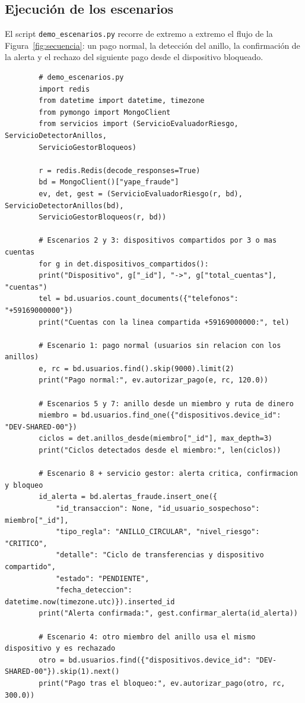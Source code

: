 \documentclass[11pt,a4paper]{article}
\begin{document}
	\subsection{Ejecución de los escenarios}
	El script \texttt{demo\_escenarios.py} recorre de extremo a extremo el flujo de la Figura~\ref{fig:secuencia}: un pago normal, la detección del anillo, la confirmación de la alerta y el rechazo del siguiente pago desde el dispositivo bloqueado.
	\begin{lstlisting}
		# demo_escenarios.py
		import redis
		from datetime import datetime, timezone
		from pymongo import MongoClient
		from servicios import (ServicioEvaluadorRiesgo, ServicioDetectorAnillos,
		ServicioGestorBloqueos)
		
		r = redis.Redis(decode_responses=True)
		bd = MongoClient()["yape_fraude"]
		ev, det, gest = (ServicioEvaluadorRiesgo(r, bd), ServicioDetectorAnillos(bd),
		ServicioGestorBloqueos(r, bd))
		
		# Escenarios 2 y 3: dispositivos compartidos por 3 o mas cuentas
		for g in det.dispositivos_compartidos():
		print("Dispositivo", g["_id"], "->", g["total_cuentas"], "cuentas")
		tel = bd.usuarios.count_documents({"telefonos": "+59169000000"})
		print("Cuentas con la linea compartida +59169000000:", tel)
		
		# Escenario 1: pago normal (usuarios sin relacion con los anillos)
		e, rc = bd.usuarios.find().skip(9000).limit(2)
		print("Pago normal:", ev.autorizar_pago(e, rc, 120.0))
		
		# Escenarios 5 y 7: anillo desde un miembro y ruta de dinero
		miembro = bd.usuarios.find_one({"dispositivos.device_id": "DEV-SHARED-00"})
		ciclos = det.anillos_desde(miembro["_id"], max_depth=3)
		print("Ciclos detectados desde el miembro:", len(ciclos))
		
		# Escenario 8 + servicio gestor: alerta critica, confirmacion y bloqueo
		id_alerta = bd.alertas_fraude.insert_one({
			"id_transaccion": None, "id_usuario_sospechoso": miembro["_id"],
			"tipo_regla": "ANILLO_CIRCULAR", "nivel_riesgo": "CRITICO",
			"detalle": "Ciclo de transferencias y dispositivo compartido",
			"estado": "PENDIENTE",
			"fecha_deteccion": datetime.now(timezone.utc)}).inserted_id
		print("Alerta confirmada:", gest.confirmar_alerta(id_alerta))
		
		# Escenario 4: otro miembro del anillo usa el mismo dispositivo y es rechazado
		otro = bd.usuarios.find({"dispositivos.device_id": "DEV-SHARED-00"}).skip(1).next()
		print("Pago tras el bloqueo:", ev.autorizar_pago(otro, rc, 300.0))
	\end{lstlisting}
	
\end{document}
